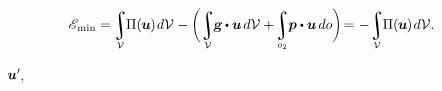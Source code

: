 \nopagebreak\vspace{-0.33em}
\begin{equation*}
\potentialenergyfunctional_{\hspace{-0.1ex}\text{min}}
= \hspace{-0.2ex}
\scalebox{.9}{$
   \displaystyle\integral\displaylimits_{\mathcal{V}}$} \hspace{-0.2ex}
   \potentialenergydensity ( \hspace{-0.1ex}\bm{u}\hspace{-0.1ex} ) \hspace{.2ex} d\mathcal{V} \hspace{.1ex}
   - \scalebox{.88}[1]{$ \biggl( $} \hspace{.1ex}
   \scalebox{.9}{$ \displaystyle \integral \displaylimits_{\mathcal{V}} $} \hspace{-0.2ex}
   \volumeloadvector \hspace{-0.1ex} \dotp \bm{u} \hspace{.3ex} d\mathcal{V}
   + \hspace{-0.3ex}
   \scalebox{.9}{$ \displaystyle \integral \displaylimits_{o_2} $} \hspace{-0.1ex}
   \bm{p} \dotp \bm{u} \hspace{.33ex}
   do
   \scalebox{.88}[1]{$ \biggr) $} \hspace{-0.3ex}
   = \hspace{.1ex} - \hspace{.1ex}
   \scalebox{.9}{$ \displaystyle \integral \displaylimits_{\mathcal{V}} $} \hspace{-0.2ex}
   \potentialenergydensity (\hspace{-0.1ex} \bm{u} \hspace{-0.1ex}) \hspace{.2ex}
   d\mathcal{V}
   .
\vspace{-0.1em}
\end{equation*}

~${\bm{u}'\hspace{-0.25ex}}$,

